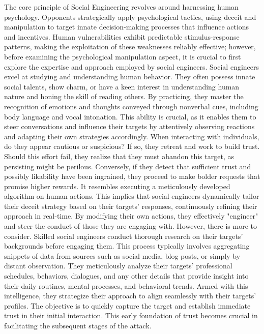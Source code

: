 The core principle of Social Engineering revolves around harnessing human psychology. Opponents strategically apply psychological tactics, using deceit and manipulation to target innate decision-making processes that influence actions and incentives. Human vulnerabilities exhibit predictable stimulus-response patterns, making the exploitation of these weaknesses reliably effective; however, before examining the psychological manipulation aspect, it is crucial to first explore the expertise and approach employed by social engineers.
Social engineers excel at studying and understanding human behavior. They often possess innate social talents, show charm, or have a keen interest in understanding human nature and honing the skill of reading others. By practicing, they master the recognition of emotions and thoughts conveyed through nonverbal cues, including body language and vocal intonation. This ability is crucial, as it enables them to steer conversations and influence their targets by attentively observing reactions and adapting their own strategies accordingly.
When interacting with individuals, do they appear cautious or suspicious? If so, they retreat and work to build trust. Should this effort fail, they realize that they must abandon this target, as persisting might be perilous. Conversely, if they detect that sufficient trust and possibly likability have been ingrained, they proceed to make bolder requests that promise higher rewards. It resembles executing a meticulously developed algorithm on human actions. This implies that social engineers dynamically tailor their deceit strategy based on their targets' responses, continuously refining their approach in real-time. By modifying their own actions, they effectively "engineer" and steer the conduct of those they are engaging with.
However, there is more to consider. Skilled social engineers conduct thorough research on their targets' backgrounds before engaging them. This process typically involves aggregating snippets of data from sources such as social media, blog posts, or simply by distant observation. They meticulously analyze their targets' professional schedules, behaviors, dialogues, and any other details that provide insight into their daily routines, mental processes, and behavioral trends. Armed with this intelligence, they strategize their approach to align seamlessly with their targets' profiles. The objective is to quickly capture the target and establish immediate trust in their initial interaction. This early foundation of trust becomes crucial in facilitating the subsequent stages of the attack.
